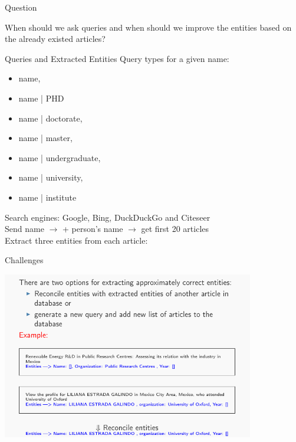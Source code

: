 \documentclass{beamer}
\newcommand{\remark}[1]{{\color{blue}{#1}}}
\newcommand{\PA}[1]{{\color{mygreen}{#1}}}
\begin{document}
\begin{frame}{Question}
	\begin{center}
		When should we ask queries and when should we improve the
		entities based on the already existed articles?
	\end{center}
\end{frame}

\begin{frame}{Queries and Extracted Entities}
Query types for a given name:
\begin{itemize}
	\item name, 
	\item name | PHD
	\item name | doctorate,
	\item name | master,
	\item name | undergraduate,
	\item name | university,
	\item name | institute
\end{itemize}
\vspace{0.3cm}
Search engines: Google, Bing, DuckDuckGo and Citeseer\\
Send name $\longrightarrow$ \PA{generate query} + person's name $\longrightarrow$ get first 20 articles \\
\vspace{0.3cm}
Extract three entities from each article:\\
\remark{Person's name, Organisation name, year- time}

\end{frame}
\begin{frame}{Challenges}
\begin{center}
	\includegraphics[width=11cm]{iimas/options.pdf}
\end{center}
\end{frame}
\end{document}
